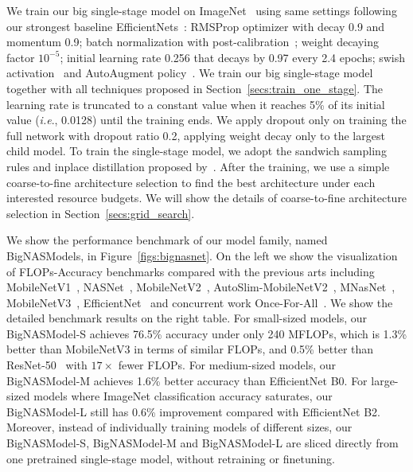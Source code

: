 \documentclass[runningheads]{llncs}
\def\onedot{.}
\def\ie{\emph{i.e}\onedot} \def\Ie{\emph{I.e}\onedot}
\begin{document}
We train our big single-stage model on ImageNet~\cite{deng2009imagenet} using same settings following our strongest baseline EfficientNets~\cite{tan2019efficientnet}: RMSProp optimizer with decay 0.9 and momentum 0.9; batch normalization with post-calibration~\cite{yu2019universally}; weight decaying factor $10^{-5}$; initial learning rate 0.256 that decays by 0.97 every 2.4 epochs; swish activation~\cite{ramachandran2018searching} and AutoAugment policy~\cite{cubuk2019autoaugment}. We train our big single-stage model together with all techniques proposed in Section~\ref{secs:train_one_stage}. The learning rate is truncated to a constant value when it reaches 5\% of its initial value (\ie, 0.0128) until the training ends. We apply dropout only on training the full network with dropout ratio 0.2, applying weight decay only to the largest child model. To train the single-stage model, we adopt the sandwich sampling rules and inplace distillation proposed by~\cite{yu2019universally}. After the training, we use a simple coarse-to-fine architecture selection to find the best architecture under each interested resource budgets. We will show the details of coarse-to-fine architecture selection in Section~\ref{secs:grid_search}.

We show the performance benchmark of our model family, named BigNASModels, in Figure~\ref{figs:bignasnet}. On the left we show the visualization of FLOPs-Accuracy benchmarks compared with the previous arts including MobileNetV1~\cite{howard2017mobilenets}, NASNet~\cite{zoph2018learning}, MobileNetV2~\cite{sandler2018inverted}, AutoSlim-MobileNetV2~\cite{yu2019network}, MNasNet~\cite{tan2018mnasnet}, MobileNetV3~\cite{howard2019searching}, EfficientNet~\cite{tan2019efficientnet} and concurrent work Once-For-All~\cite{cai2019once}. We show the detailed benchmark results on the right table. For small-sized models, our BigNASModel-S achieves 76.5\% accuracy under only 240 MFLOPs, which is 1.3\% better than MobileNetV3 in terms of similar FLOPs, and 0.5\% better than ResNet-50~\cite{he2016deep} with \(17 \times\) fewer FLOPs. For medium-sized models, our BigNASModel-M achieves 1.6\% better accuracy than EfficientNet B0. For large-sized models where ImageNet classification accuracy saturates, our BigNASModel-L still has 0.6\% improvement compared with EfficientNet B2. Moreover, instead of individually training models of different sizes, our BigNASModel-S, BigNASModel-M and BigNASModel-L are sliced directly from one pretrained single-stage model, without retraining or finetuning.
\end{document}
